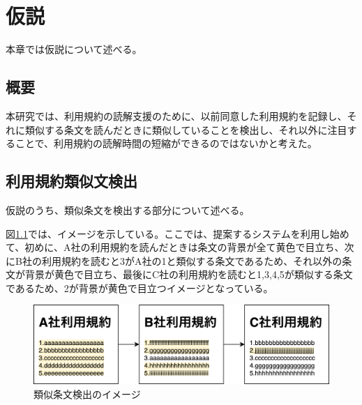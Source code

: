 \chapter{仮説}
\label{proposed}

本章では仮説について述べる。

\section{概要}
本研究では、利用規約の読解支援のために、以前同意した利用規約を記録し、それに類似する条文を読んだときに類似していることを検出し、それ以外に注目することで、利用規約の読解時間の短縮ができるのではないかと考えた。

\section{利用規約類似文検出}
\label{sub:利用規約類似文検出}
仮説のうち、類似条文を検出する部分について述べる。

図\ref{img:demo}では、イメージを示している。ここでは、提案するシステムを利用し始めて、初めに、A社の利用規約を読んだときは条文の背景が全て黄色で目立ち、次にB社の利用規約を読むと3がA社の1と類似する条文であるため、それ以外の条文が背景が黄色で目立ち、最後にC社の利用規約を読むと1,3,4,5が類似する条文であるため、2が背景が黄色で目立つイメージとなっている。
\begin{figure}[h]
  \begin{center}
      \includegraphics[width=15cm]{img/demo.drawio.png}
      \caption{類似条文検出のイメージ}
      \label{img:demo}
  \end{center}
\end{figure}

